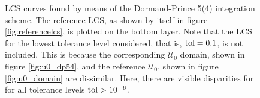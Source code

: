 \begin{figure}[htpb]
    \centering
    
    \caption[LCS curves found by means of the Dormand-Prince 5(4) integration
    scheme]{
        LCS curves found by means of the Dormand-Prince 5(4) integration
        scheme. The reference LCS, as shown by itself in figure
        \ref{fig:referencelcs}, is plotted on the bottom layer. Note that
        the LCS for the lowest tolerance level considered, that is,
        $\textnormal{tol}=0.1$, is not included. This is because the
        corresponding $\mathcal{U}_{0}$ domain, shown in figure
        \ref{fig:u0_dp54}, and the reference $\mathcal{U}_{0}$, shown in figure
        \ref{fig:u0_domain} are dissimilar. Here, there are visible
        disparities for for all tolerance levels $\textnormal{tol}>10^{-6}$.}
    \label{fig:lcs_rkdp54}
\end{figure}
